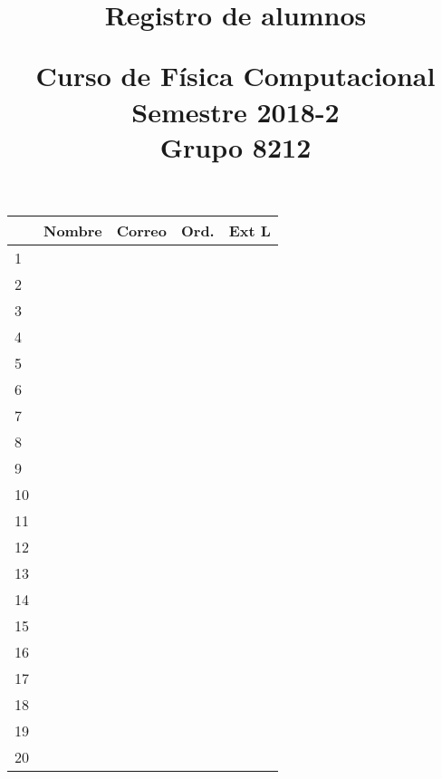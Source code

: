 \documentclass[11pt]{article}
\title{Registro de alumnos \\ \begin{large}Curso de Física Computacional \\ Semestre 2018-2   \\ Grupo 8212 \end{large}}
\date{ }
\begin{document}
\maketitle
\fontsize{12}{12}\selectfont
\begin{tabular}{| l | >{\centering\arraybackslash}m{7cm}| >{\centering\arraybackslash}m{5cm} | c | c |}
\hline
 & Nombre & Correo & Ord. & Ext L \\
\hline 1 & & & & \\
\hline 2 & & & &  \\
\hline 3 & & & &  \\
\hline 4 & & & &  \\
\hline 5 & & & &  \\
\hline 6 & & & &  \\
\hline 7 & & & &  \\
\hline 8 & & & &  \\
\hline 9 & & & &  \\
\hline 10 & & & &  \\
\hline 11 & & & &  \\
\hline 12 & & & &  \\
\hline 13 & & & &  \\
\hline 14 & & & &  \\
\hline 15 & & & &  \\
\hline 16 & & & &  \\
\hline 17 & & & &  \\
\hline 18 & & & &  \\
\hline 19 & & & &  \\
\hline 20 & & & &  \\
\hline
\end{tabular}
\end{document}
